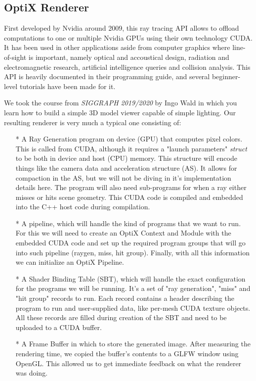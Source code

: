 \subsection{OptiX Renderer}
First developed by Nvidia around 2009, this ray tracing API allows to offload computations to one or multiple Nvidia GPUs using their own technology CUDA. It has been used in other applications aside from computer graphics where line-of-sight is important, namely optical and accoustical design, radiation and electromagnetic research, artificial intelligence queries and collision analysis. This API is heavily documented in their programming guide, and several beginner-level tutorials have been made for it.

We took the course from \textit{SIGGRAPH 2019/2020} by Ingo Wald in which you learn how to build a simple 3D model viewer capable of simple lighting. Our resulting renderer is very much a typical one consisting of:

\begin{itemize}
  \item[*]{A Ray Generation program on device (GPU) that computes pixel colors. This is called from CUDA, although it requires a "launch parameters" \textit{struct} to be both in device and host (CPU) memory. This structure will encode things like the camera data and acceleration structure (AS). It allows for compaction in the AS, but we will not be diving in it's implementation details here. The program will also need sub-programs for when a ray either misses or hits scene geometry. This CUDA code is compiled and embedded into the C++ host code during compilation.}
  \item[*]{A pipeline, which will handle the kind of programs that we want to run. For this we will need to create an OptiX Context and Module with the embedded CUDA code and set up the required program groups that will go into such pipeline (raygen, miss, hit group). Finally, with all this information we can initialize an OptiX Pipeline.}
  \item[*]{A Shader Binding Table (SBT), which will handle the exact configuration for the programs we will be running. It's a set of "ray generation", "miss" and "hit group" records to run. Each record contains a header describing the program to run and user-supplied data, like per-mesh CUDA texture objects. All these records are filled during creation of the SBT and need to be uploaded to a CUDA buffer.}
  \item[*]{A Frame Buffer in which to store the generated image. After measuring the rendering time, we copied the buffer's contents to a GLFW window using OpenGL. This allowed us to get immediate feedback on what the renderer was doing.}
\end{itemize}

